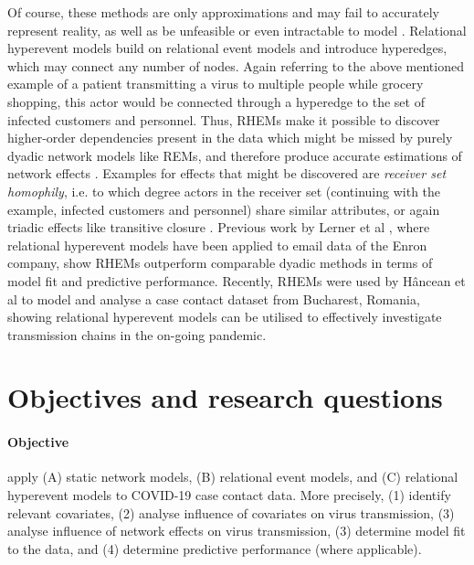 \documentclass{article}
\begin{document}
	Of course, these methods are only approximations and may fail to accurately represent reality, as well as be unfeasible or even intractable to model \cite{lerner2021relational}. Relational hyperevent models \cite{lerner2021relational,lerner2019rem} build on relational event models and introduce hyperedges, which may connect any number of nodes. Again referring to the above mentioned example of a patient transmitting a virus to multiple people while grocery shopping, this actor would be connected through a hyperedge to the set of infected customers and personnel. Thus, RHEMs make it possible to discover higher-order dependencies present in the data which might be missed by purely dyadic network models like REMs, and therefore produce accurate estimations of network effects \cite{lerner2019rem}. Examples for effects that might be discovered are \emph{receiver set homophily}, i.e. to which degree actors in the receiver set (continuing with the example, infected customers and personnel) share similar attributes, or again triadic effects like transitive closure \cite{lerner2021relational}. Previous work by Lerner et al \cite{lerner2021relational}, where relational hyperevent models have been applied to email data of the Enron company, show RHEMs outperform comparable dyadic methods in terms of model fit and predictive performance. Recently, RHEMs were used by Hâncean et al \cite{hancean2022occupations} to model and analyse a case contact dataset from Bucharest, Romania, showing relational hyperevent models can be utilised to effectively investigate transmission chains in the on-going pandemic.
	\section{Objectives and research questions}
	\label{sec:Research_questions}
	\paragraph{Objective} apply (A) static network models, (B) relational event models, and (C) relational hyperevent models to COVID-19 case contact data. More precisely, (1) identify relevant covariates, (2) analyse influence of covariates on virus transmission, (3) analyse influence of network effects on virus transmission, (3) determine model fit to the data, and (4) determine predictive performance (where applicable).
\end{document}
